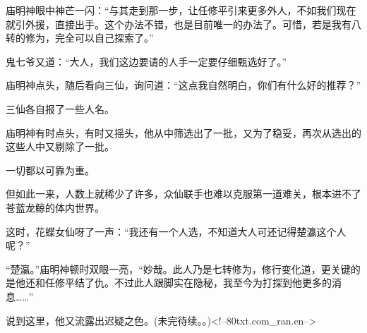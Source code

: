 \begin{this_body}
庙明神眼中神芒一闪：“与其走到那一步，让任修平引来更多外人，不如我们现在就引外援，直接出手。这个办法不错，也是目前唯一的办法了。可惜，若是我有八转的修为，完全可以自己探索了。”

鬼七爷又道：“大人，我们这边要请的人手一定要仔细甄选好了。”

庙明神点头，随后看向三仙，询问道：“这点我自然明白，你们有什么好的推荐？”

三仙各自报了一些人名。

庙明神有时点头，有时又摇头，他从中筛选出了一批，又为了稳妥，再次从选出的这些人中又剔除了一批。

一切都以可靠为重。

但如此一来，人数上就稀少了许多，众仙联手也难以克服第一道难关，根本进不了苍蓝龙鲸的体内世界。

这时，花蝶女仙呀了一声：“我还有一个人选，不知道大人可还记得楚瀛这个人呢？”

“楚瀛。”庙明神顿时双眼一亮，“妙哉。此人乃是七转修为，修行变化道，更关键的是他还和任修平结了仇。不过此人跟脚实在隐秘，我至今为打探到他更多的消息……”

说到这里，他又流露出迟疑之色。(未完待续。。)<!--80txt.com\_ran.en-->

\end{this_body}

